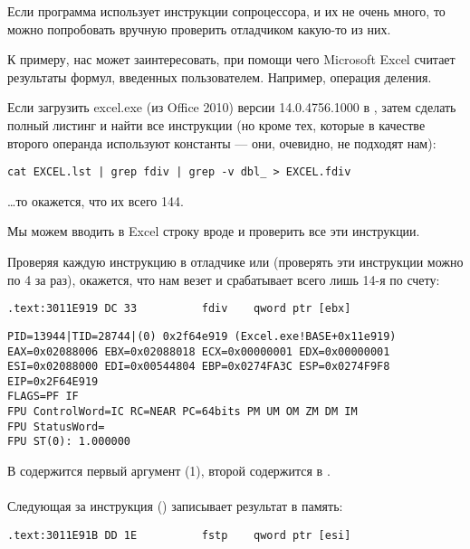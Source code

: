 
Если программа использует инструкции сопроцессора, и их не очень много, 
то можно попробовать вручную проверить отладчиком какую-то из них.

\par К примеру, нас может заинтересовать, при помощи чего Microsoft Excel считает 
результаты формул, введенных пользователем. Например, операция деления.

\myindex{\GrepUsage}
Если загрузить excel.exe (из Office 2010) версии 14.0.4756.1000 в \IDA, затем сделать полный листинг 
и найти все инструкции \FDIV (но кроме тех, которые в качестве второго операнда используют константы --- они, 
очевидно, не подходят нам):

\begin{lstlisting}
cat EXCEL.lst | grep fdiv | grep -v dbl_ > EXCEL.fdiv
\end{lstlisting}

\dots то окажется, что их всего 144.

\par Мы можем вводить в Excel строку вроде  и проверить все эти инструкции.

\par Проверяя каждую инструкцию в отладчике или \tracer 
(проверять эти инструкции можно по 4 за раз), 
окажется, что нам везет и срабатывает всего лишь 14-я по счету:

\begin{lstlisting}[style=customasmx86]
.text:3011E919 DC 33          fdiv    qword ptr [ebx]
\end{lstlisting}

\begin{lstlisting}
PID=13944|TID=28744|(0) 0x2f64e919 (Excel.exe!BASE+0x11e919)
EAX=0x02088006 EBX=0x02088018 ECX=0x00000001 EDX=0x00000001
ESI=0x02088000 EDI=0x00544804 EBP=0x0274FA3C ESP=0x0274F9F8
EIP=0x2F64E919
FLAGS=PF IF
FPU ControlWord=IC RC=NEAR PC=64bits PM UM OM ZM DM IM 
FPU StatusWord=
FPU ST(0): 1.000000
\end{lstlisting}

В  содержится первый аргумент (1), второй содержится в \TT{[EBX]}.\\
\\
Следующая за \FDIV инструкция () записывает результат в память: \\

\begin{lstlisting}[style=customasmx86]
.text:3011E91B DD 1E          fstp    qword ptr [esi]
\end{lstlisting}

